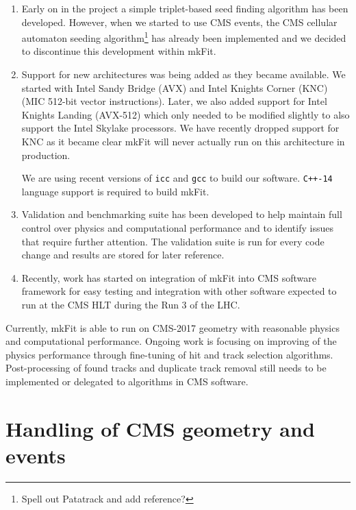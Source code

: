 \documentclass{webofc}
\def\mkfit{mkFit\xspace}
\def\stt#1{{\small\texttt{#1}}}
\begin{document}
\begin{enumerate}
\item Early on in the project a simple triplet-based seed finding algorithm
  has been developed. However, when we started to use CMS events, the CMS
  cellular automaton seeding algorithm\footnote{Spell out Patatrack and add
    reference?} has already been implemented and we decided to discontinue
  this development within \mkfit.

\item Support for new architectures was being added as they became
  available. We started with Intel Sandy Bridge (AVX) and Intel Knights
  Corner (KNC) (MIC 512-bit vector instructions). Later, we also added support for
  Intel Knights Landing (AVX-512) which only needed to be modified slightly
  to also support the Intel Skylake processors. We have recently dropped
  support for KNC as it became clear \mkfit will never actually run
  on this architecture in production.

  We are using recent versions of \stt{icc} and \stt{gcc} to build our
  software. \stt{C++-14} language support is required to build \mkfit.

\item Validation and benchmarking suite has been developed to help maintain
  full control over physics and computational performance and to identify
  issues that require further attention. The validation suite is run for every
  code change and results are stored for later reference.

\item Recently, work has started on integration of \mkfit into CMS software
  framework for easy testing and integration with other software expected to
  run at the CMS HLT during the Run 3 of the LHC.

\end{enumerate}

Currently, \mkfit is able to run on CMS-2017 geometry with reasonable physics
and computational performance. Ongoing work is focusing on improving of the
physics performance through fine-tuning of hit and track selection
algorithms. Post-processing of found tracks and duplicate track removal
still needs to be implemented or delegated to algorithms in CMS
software. 


\section{Handling of CMS geometry and events}
\label{sec:cms-geom-and-events}
\end{document}
